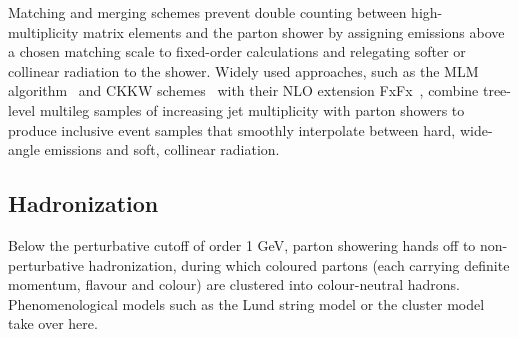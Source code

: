 Matching and merging schemes prevent double counting between high-multiplicity matrix elements and the parton shower by assigning emissions above a chosen matching scale to fixed-order calculations and relegating softer or collinear radiation to the shower. Widely used approaches, such as the MLM algorithm~\cite{MANGANO2002343} and CKKW schemes~\cite{Catani_2001} with their NLO extension FxFx~\cite{Frederix_2012}, combine tree-level multileg samples
of increasing jet multiplicity with parton showers to produce inclusive event samples that smoothly interpolate between hard, wide-angle emissions and soft, collinear radiation.

\subsection*{Hadronization}
\label{subsec:Hadronization}

Below the perturbative cutoff of order 1 GeV, parton showering hands off to non-perturbative hadronization, during which coloured partons (each carrying definite momentum, flavour and colour) are clustered into colour-neutral hadrons. Phenomenological models such as the Lund string model or the cluster model take over here.


